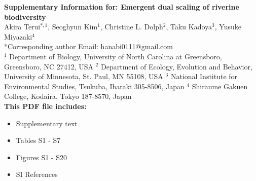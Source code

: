 \begin{flushleft}
\LARGE{\textbf{Supplementary Information for: \newline Emergent dual scaling of riverine biodiversity}}\\
\vspace*{\baselineskip}
\large{Akira Terui$^{*,1}$, Seoghyun Kim$^1$, Christine L. Dolph$^2$, Taku Kadoya$^3$, Yusuke Miyazaki$^4$}\\
\vspace*{1\baselineskip}
\normalsize{*Corresponding author \newline Email: hanabi0111@gmail.com}\\
\vspace*{1\baselineskip}
\normalsize{
$^1$ Department of Biology, University of North Carolina at Greensboro, Greensboro, NC 27412, USA \newline
$^2$ Department of Ecology, Evolution and Behavior, University of Minnesota, St. Paul, MN 55108, USA \newline
$^3$ National Institute for Environmental Studies, Tsukuba, Ibaraki 305-8506, Japan \newline
$^4$ Shiraume Gakuen College, Kodaira, Tokyo 187-8570, Japan}\\
\vspace*{2\baselineskip}
\textbf{This PDF file includes:}
\begin{itemize}
\item Supplementary text
\item Tables S1 - S7
\item Figures S1 - S20
\item SI References
\end{itemize}
\end{flushleft}

\newpage